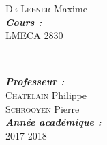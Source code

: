 \begin{titlepage}
\begin{minipage}{0.4\textwidth}
\begin{flushleft}
\textsc{De Leener} Maxime
\\[0,4cm]
\emph{\textbf{Cours :\ }}\\\textsc{\large LMECA 2830}\\[0.4cm] %


\end{flushleft}
\end{minipage}
~
\begin{minipage}{0.4\textwidth}
\begin{flushright} \large

\emph{\textbf{Professeur :}} \\
\textsc{Chatelain} Philippe\\
\textsc{Schrooyen} Pierre\\ [0,4cm]

\emph{\textbf{Année académique :\ }}\\\textsc{\large 2017-2018}\\[0.4cm] %


\end{flushright}
\end{minipage}\\[0cm]


~
\begin{minipage}{0.4\textwidth}

\end{minipage}

\vfill %

\end{titlepage}
